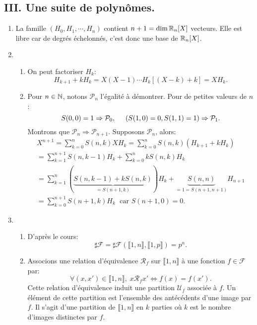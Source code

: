 \subsection*{III. Une suite de polynômes.}
\begin{enumerate}
 \item La famille $(H_0,H_1, \cdots,H_n)$ contient $n+1 = \dim \mathbb{R}_n[X]$ vecteurs. Elle est libre car de degrés échelonnés, c'est donc une base de $\mathbb{R}_n[X]$.
 
 \item
 \begin{enumerate}
  \item On peut factoriser $H_k$:
\[
 H_{k+1} + k H_k = X(X-1) \cdots H_k\left[ (X-k) + k\right] = X H_k. 
\]

  \item Pour $n\in \mathbb{N}$, notons $\mathcal{P}_n$ l'égalité à démontrer. Pour de petites valeurs de $n$:
\[
 S(0,0) = 1 \Rightarrow \mathcal{P}_0, \hspace{0.5cm} \left( S(1,0)=0, S(1,1) = 1\right) \Rightarrow \mathcal{P}_1.
\]
Montrons que $\mathcal{P}_n\Rightarrow \mathcal{P}_{n+1}$. Supposons $\mathcal{P}_n$, alors:
\begin{multline*}
 X^{n+1}= \sum_{k=0}^nS(n,k)XH_k
 = \sum_{k=0}^nS(n,k)\left( H_{k+1} + kH_k\right) \\
 = \sum_{k=1}^{n+1}S(n,k-1)H_k + \sum_{k=0}^nkS(n,k)H_k\\
 = \sum_{k=1}^{n}\left( \underset{= S(n+1,k)}{\underbrace{S(n,k-1) + kS(n,k)}}\right) H_k + \underset{ = 1 = S(n+1,n+1)}{\underbrace{S(n,n)}}H_{n+1}\\
 = \sum_{k=0}^{n+1}S(n+1,k)H_k \; \text{ car $S(n+1,0) = 0$.}
\end{multline*}
 \end{enumerate}

 \item
 \begin{enumerate}
  \item D'après le cours:
  \[
   \sharp\mathcal{F} = \sharp \mathcal{F}(\llbracket 1,n \rrbracket,\llbracket 1,p \rrbracket) = p^n.
  \]

  \item Associons une relation d'équivalence $\mathcal{R}_f$ sur $\llbracket 1,n \rrbracket$ à une fonction $f\in \mathcal{F}$ par:
\[
 \forall(x,x') \in \llbracket 1,n\rrbracket, \; x \mathcal{R}_f x' \Leftrightarrow f(x) = f(x').
\]
  Cette relation d'équivalence induit une partition $\mathcal{U}_f$ associée à $f$. Un élément de cette partition est l'ensemble des antécédents d'une image par $f$. Il s'agit d'une partition de $\llbracket 1,n \rrbracket$ en $k$ parties où $k$ est le nombre d'images distinctes par $f$.
  

\end{enumerate}
\end{enumerate}

